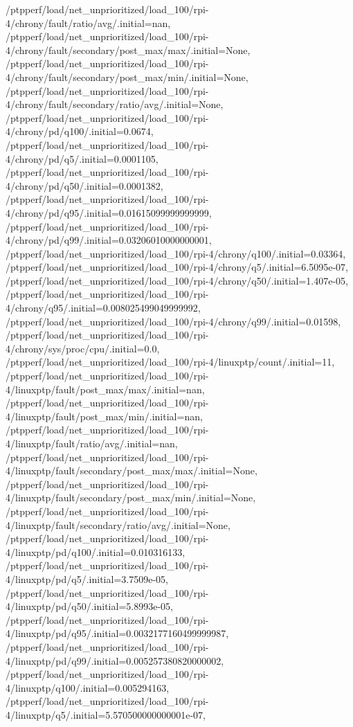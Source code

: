 {    /ptpperf/load/net_unprioritized/load_100/rpi-4/chrony/fault/ratio/avg/.initial=nan,
    /ptpperf/load/net_unprioritized/load_100/rpi-4/chrony/fault/secondary/post_max/max/.initial=None,
    /ptpperf/load/net_unprioritized/load_100/rpi-4/chrony/fault/secondary/post_max/min/.initial=None,
    /ptpperf/load/net_unprioritized/load_100/rpi-4/chrony/fault/secondary/ratio/avg/.initial=None,
    /ptpperf/load/net_unprioritized/load_100/rpi-4/chrony/pd/q100/.initial=0.0674,
    /ptpperf/load/net_unprioritized/load_100/rpi-4/chrony/pd/q5/.initial=0.0001105,
    /ptpperf/load/net_unprioritized/load_100/rpi-4/chrony/pd/q50/.initial=0.0001382,
    /ptpperf/load/net_unprioritized/load_100/rpi-4/chrony/pd/q95/.initial=0.01615099999999999,
    /ptpperf/load/net_unprioritized/load_100/rpi-4/chrony/pd/q99/.initial=0.03206010000000001,
    /ptpperf/load/net_unprioritized/load_100/rpi-4/chrony/q100/.initial=0.03364,
    /ptpperf/load/net_unprioritized/load_100/rpi-4/chrony/q5/.initial=6.5095e-07,
    /ptpperf/load/net_unprioritized/load_100/rpi-4/chrony/q50/.initial=1.407e-05,
    /ptpperf/load/net_unprioritized/load_100/rpi-4/chrony/q95/.initial=0.008025499049999992,
    /ptpperf/load/net_unprioritized/load_100/rpi-4/chrony/q99/.initial=0.01598,
    /ptpperf/load/net_unprioritized/load_100/rpi-4/chrony/sys/proc/cpu/.initial=0.0,
    /ptpperf/load/net_unprioritized/load_100/rpi-4/linuxptp/count/.initial=11,
    /ptpperf/load/net_unprioritized/load_100/rpi-4/linuxptp/fault/post_max/max/.initial=nan,
    /ptpperf/load/net_unprioritized/load_100/rpi-4/linuxptp/fault/post_max/min/.initial=nan,
    /ptpperf/load/net_unprioritized/load_100/rpi-4/linuxptp/fault/ratio/avg/.initial=nan,
    /ptpperf/load/net_unprioritized/load_100/rpi-4/linuxptp/fault/secondary/post_max/max/.initial=None,
    /ptpperf/load/net_unprioritized/load_100/rpi-4/linuxptp/fault/secondary/post_max/min/.initial=None,
    /ptpperf/load/net_unprioritized/load_100/rpi-4/linuxptp/fault/secondary/ratio/avg/.initial=None,
    /ptpperf/load/net_unprioritized/load_100/rpi-4/linuxptp/pd/q100/.initial=0.010316133,
    /ptpperf/load/net_unprioritized/load_100/rpi-4/linuxptp/pd/q5/.initial=3.7509e-05,
    /ptpperf/load/net_unprioritized/load_100/rpi-4/linuxptp/pd/q50/.initial=5.8993e-05,
    /ptpperf/load/net_unprioritized/load_100/rpi-4/linuxptp/pd/q95/.initial=0.0032177160499999987,
    /ptpperf/load/net_unprioritized/load_100/rpi-4/linuxptp/pd/q99/.initial=0.005257380820000002,
    /ptpperf/load/net_unprioritized/load_100/rpi-4/linuxptp/q100/.initial=0.005294163,
    /ptpperf/load/net_unprioritized/load_100/rpi-4/linuxptp/q5/.initial=5.570500000000001e-07,
}
